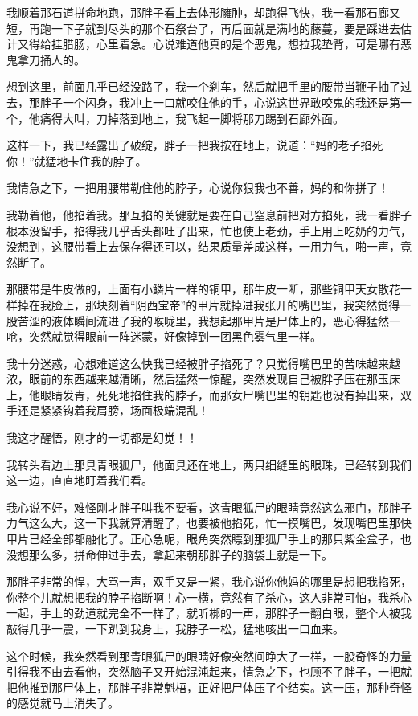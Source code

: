 我顺着那石道拼命地跑，那胖子看上去体形臃肿，却跑得飞快，我一看那石廊又短，再跑一下子就到尽头的那个石祭台了，再后面就是满地的藤蔓，要是踩进去估计又得给挂腊肠，心里着急。心说难道他真的是个恶鬼，想拉我垫背，可是哪有恶鬼拿刀捅人的。

想到这里，前面几乎已经没路了，我一个刹车，然后就把手里的腰带当鞭子抽了过去，那胖子一个闪身，我冲上一口就咬住他的手，心说这世界敢咬鬼的我还是第一个，他痛得大叫，刀掉落到地上，我飞起一脚将那刀踢到石廊外面。

这样一下，我已经露出了破绽，胖子一把我按在地上，说道：“妈的老子掐死你！”就猛地卡住我的脖子。

我情急之下，一把用腰带勒住他的脖子，心说你狠我也不善，妈的和你拼了！

我勒着他，他掐着我。那互掐的关键就是要在自己窒息前把对方掐死，我一看胖子根本没留手，掐得我几乎舌头都吐了出来，忙也使上老劲，手上用上吃奶的力气，没想到，这腰带看上去保存得还可以，结果质量差成这样，一用力气，啪一声，竟然断了。

那腰带是牛皮做的，上面有小鳞片一样的铜甲，那牛皮一断，那些铜甲天女散花一样掉在我脸上，那块刻着“阴西宝帝”的甲片就掉进我张开的嘴巴里，我突然觉得一股苦涩的液体瞬间流进了我的喉咙里，我想起那甲片是尸体上的，恶心得猛然一呛，突然就觉得眼前一阵迷蒙，好像掉到一团黑色雾气里一样。

我十分迷惑，心想难道这么快我已经被胖子掐死了？只觉得嘴巴里的苦味越来越浓，眼前的东西越来越清晰，然后猛然一惊醒，突然发现自己被胖子压在那玉床上，他眼睛发青，死死地掐住我的脖子，而那女尸嘴巴里的钥匙也没有掉出来，双手还是紧紧钩着我肩膀，场面极端混乱！

我这才醒悟，刚才的一切都是幻觉！！

我转头看边上那具青眼狐尸，他面具还在地上，两只细缝里的眼珠，已经转到我们这一边，直直地盯着我们看。

我心说不好，难怪刚才胖子叫我不要看，这青眼狐尸的眼睛竟然这么邪门，那胖子力气这么大，这一下我就算清醒了，也要被他掐死，忙一摸嘴巴，发现嘴巴里那快甲片已经全部都融化了。正心急呢，眼角突然瞟到那狐尸手上的那只紫金盒子，也没想那么多，拼命伸过手去，拿起来朝那胖子的脑袋上就是一下。

那胖子非常的悍，大骂一声，双手又是一紧，我心说你他妈的哪里是想把我掐死，你整个儿就想把我的脖子掐断啊！心一横，竟然有了杀心，这人非常可怕，我杀心一起，手上的劲道就完全不一样了，就听梆的一声，那胖子一翻白眼，整个人被我敲得几乎一震，一下趴到我身上，我脖子一松，猛地咳出一口血来。

这个时候，我突然看到那青眼狐尸的眼睛好像突然间睁大了一样，一股奇怪的力量引得我不由去看他，突然脑子又开始混沌起来，情急之下，也顾不了胖子，一把就把他推到那尸体上，那胖子非常魁梧，正好把尸体压了个结实。这一压，那种奇怪的感觉就马上消失了。

